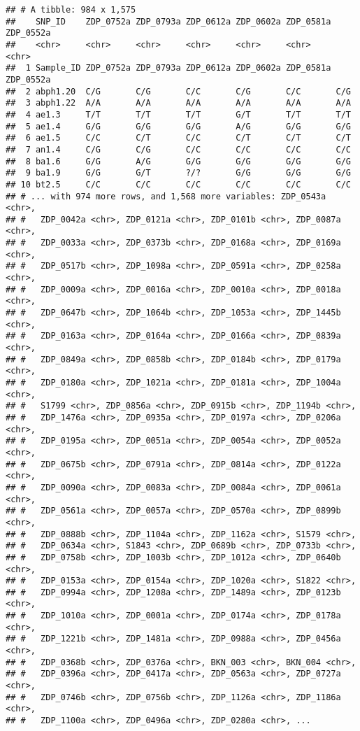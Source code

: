 \documentclass[]{article}
\begin{document}
\begin{verbatim}
## # A tibble: 984 x 1,575
##    SNP_ID    ZDP_0752a ZDP_0793a ZDP_0612a ZDP_0602a ZDP_0581a ZDP_0552a
##    <chr>     <chr>     <chr>     <chr>     <chr>     <chr>     <chr>    
##  1 Sample_ID ZDP_0752a ZDP_0793a ZDP_0612a ZDP_0602a ZDP_0581a ZDP_0552a
##  2 abph1.20  C/G       C/G       C/C       C/G       C/C       C/G      
##  3 abph1.22  A/A       A/A       A/A       A/A       A/A       A/A      
##  4 ae1.3     T/T       T/T       T/T       G/T       T/T       T/T      
##  5 ae1.4     G/G       G/G       G/G       A/G       G/G       G/G      
##  6 ae1.5     C/C       C/T       C/C       C/T       C/T       C/T      
##  7 an1.4     C/G       C/G       C/C       C/C       C/C       C/C      
##  8 ba1.6     G/G       A/G       G/G       G/G       G/G       G/G      
##  9 ba1.9     G/G       G/T       ?/?       G/G       G/G       G/G      
## 10 bt2.5     C/C       C/C       C/C       C/C       C/C       C/C      
## # ... with 974 more rows, and 1,568 more variables: ZDP_0543a <chr>,
## #   ZDP_0042a <chr>, ZDP_0121a <chr>, ZDP_0101b <chr>, ZDP_0087a <chr>,
## #   ZDP_0033a <chr>, ZDP_0373b <chr>, ZDP_0168a <chr>, ZDP_0169a <chr>,
## #   ZDP_0517b <chr>, ZDP_1098a <chr>, ZDP_0591a <chr>, ZDP_0258a <chr>,
## #   ZDP_0009a <chr>, ZDP_0016a <chr>, ZDP_0010a <chr>, ZDP_0018a <chr>,
## #   ZDP_0647b <chr>, ZDP_1064b <chr>, ZDP_1053a <chr>, ZDP_1445b <chr>,
## #   ZDP_0163a <chr>, ZDP_0164a <chr>, ZDP_0166a <chr>, ZDP_0839a <chr>,
## #   ZDP_0849a <chr>, ZDP_0858b <chr>, ZDP_0184b <chr>, ZDP_0179a <chr>,
## #   ZDP_0180a <chr>, ZDP_1021a <chr>, ZDP_0181a <chr>, ZDP_1004a <chr>,
## #   S1799 <chr>, ZDP_0856a <chr>, ZDP_0915b <chr>, ZDP_1194b <chr>,
## #   ZDP_1476a <chr>, ZDP_0935a <chr>, ZDP_0197a <chr>, ZDP_0206a <chr>,
## #   ZDP_0195a <chr>, ZDP_0051a <chr>, ZDP_0054a <chr>, ZDP_0052a <chr>,
## #   ZDP_0675b <chr>, ZDP_0791a <chr>, ZDP_0814a <chr>, ZDP_0122a <chr>,
## #   ZDP_0090a <chr>, ZDP_0083a <chr>, ZDP_0084a <chr>, ZDP_0061a <chr>,
## #   ZDP_0561a <chr>, ZDP_0057a <chr>, ZDP_0570a <chr>, ZDP_0899b <chr>,
## #   ZDP_0888b <chr>, ZDP_1104a <chr>, ZDP_1162a <chr>, S1579 <chr>,
## #   ZDP_0634a <chr>, S1843 <chr>, ZDP_0689b <chr>, ZDP_0733b <chr>,
## #   ZDP_0758b <chr>, ZDP_1003b <chr>, ZDP_1012a <chr>, ZDP_0640b <chr>,
## #   ZDP_0153a <chr>, ZDP_0154a <chr>, ZDP_1020a <chr>, S1822 <chr>,
## #   ZDP_0994a <chr>, ZDP_1208a <chr>, ZDP_1489a <chr>, ZDP_0123b <chr>,
## #   ZDP_1010a <chr>, ZDP_0001a <chr>, ZDP_0174a <chr>, ZDP_0178a <chr>,
## #   ZDP_1221b <chr>, ZDP_1481a <chr>, ZDP_0988a <chr>, ZDP_0456a <chr>,
## #   ZDP_0368b <chr>, ZDP_0376a <chr>, BKN_003 <chr>, BKN_004 <chr>,
## #   ZDP_0396a <chr>, ZDP_0417a <chr>, ZDP_0563a <chr>, ZDP_0727a <chr>,
## #   ZDP_0746b <chr>, ZDP_0756b <chr>, ZDP_1126a <chr>, ZDP_1186a <chr>,
## #   ZDP_1100a <chr>, ZDP_0496a <chr>, ZDP_0280a <chr>, ...
\end{verbatim}
\end{document}
